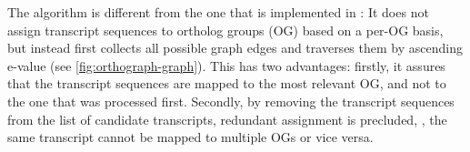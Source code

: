 The \pname algorithm is different from the one that is implemented in \hamstr:
It does not assign transcript sequences to ortholog groups (OG) based on a
per-OG basis, but instead first collects all possible graph edges  and traverses
them by ascending  e-value (see \autoref{fig:orthograph-graph}).
This has two advantages: firstly, it assures that the transcript sequences are
mapped to the most relevant OG, and not to the one that was processed first.
Secondly, by removing the transcript sequences from the list of candidate
transcripts, redundant assignment is precluded, \ie, the same transcript cannot
be mapped to multiple OGs or vice versa.
